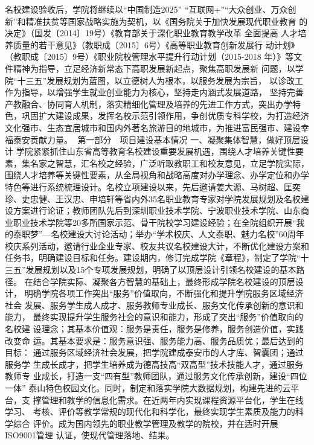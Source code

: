 名校建设验收后，学院将继续以“中国制造2025” “互联网+”“大众创业、万众创
新”和精准扶贫等国家战略实施为契机，以《国务院关于加快发展现代职业教育
的决定》（国发〔2014〕19号）《教育部关于深化职业教育教学改革 全面提高
人才培养质量的若干意见》（教职成〔2015〕6号）《高等职业教育创新发展行
动计划》（教职成〔2015〕9号）《职业院校管理水平提升行动计划（2015-2018
年）》等文件精神为指导，立足经济新常态下高职发展新起点，聚焦高职发展新
问题，以学院“十三五”发展规划为蓝图，以立德树人为根本，以服务发展为宗旨，
以诊改工作为指导，以增强学生就业创业能力为核心，坚持走内涵式发展道路，
坚持完善产教融合、协同育人机制，落实精细化管理及培养的先进工作方式，突出办学特色，巩固扩大建设成果，发挥名校示范引领作用，争创优质专科学校，为打造经济文化强市、生态宜居城市和国内外著名旅游目的地城市，为推进富民强市、建设幸福泰安贡献力量。
第一部分　项目建设基本情况
一、凝聚集体智慧，做好顶层设计
学院紧紧抓住山东省高等教育名校建设重要发展机遇，围绕人才培养关键性要素，集名家之智慧，汇名校之经验，广泛听取教职工和校友意见，立足学院实际，围绕人才培养等关键性要素，从全局视角和战略高度对办学理念、办学定位和办学特色等进行系统梳理设计。名校立项建设以来，先后邀请姜大源、马树超、匡奕珍、史忠健、王汉忠、申培轩等省内外35名职业教育专家对学院发展规划及名校建设方案进行论证；教师团队先后到深圳职业技术学院、宁波职业技术学院、山东商业职业技术学院等20多所国家示范、骨干院校学习建设经验；在全院组织开展“我的泰职梦”—名校建设大讨论活动；举办“学术校庆、人文泰职、魅力名校”60周年校庆系列活动，邀请行业企业专家、校友共议名校建设大计，不断优化建设方案和任务书，明确建设目标和任务。建设期内，修订完成学院《章程》，制定了学院“十三五”发展规划以及15个专项发展规划，明确了以顶层设计引领名校建设的基本路径。
在结合学院实际、凝聚各方智慧的基础上，最终形成学院名校建设的顶层设计，
明确学院各项工作突出“服务”价值取向，不断强化和提升学院服务区域经济社会
发展、服务学生成人成才、服务教师专业成长、服务文化传承创新的意识和能力，
最终实现提升学生服务社会的意识和能力，形成了突出“服务”价值取向的名校建
设理念；其基本价值观：服务是责任，服务是修养，服务创造价值，实践改变命
运。其基本要求是：服务意识强、服务能力高、服务品质优；最后达到的目标：
通过服务区域经济社会发展，把学院建成泰安市的人才库、智囊团；通过服务学
生成长成才，把学生培养成为德高技高“双高型”技术技能人才，通过服务教师专
业成长，打造一支“四有型”教师团队，通过服务文化传承创新，建设“四位一体”
泰山特色校园文化。同时，制定和落实学院大数据规划，构建先进的云平台，支
撑管理和教学的信息化需求。在近两年内实现课程资源平台化，学生在线学习、
考核、评价等教学常规的现代化和科学化，最终实现学生素质及能力的科学综合
评价。成为国内领先的职业教学管理及教学的院校，并在适时开展ISO9001管理
认证，使现代管理落地、结果。

